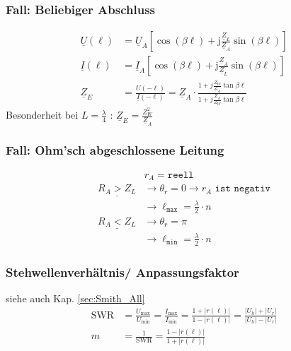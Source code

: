 \subsubsection{Fall: Beliebiger Abschluss}
\begin{align*}
    \underline{U}(\ell) &= \underline{U}_A\left[\cos (\beta \ell)+\mathrm{j} \frac{\underline{Z}_L}{\underline{Z}_A} \sin (\beta \ell)\right] \\
    \underline{I}(\ell) &= \underline{I}_A\left[\cos (\beta \ell)+\mathrm{j} \frac{\underline{Z}_A}{\underline{Z}_L} \sin (\beta \ell)\right] \\
    \underline{Z}_E     &= \frac{U(-\ell)}{\underline{I}(-\ell)}= \underline{Z}_A \cdot \frac{1+j \frac{Z_W}{\underline{Z}_A} \tan \beta \ell}{1+j \frac{\underline{Z}_A}{Z_W} \tan \beta \ell} 
\end{align*}
Besonderheit bei $L=\frac{\lambda}{4}$ :
$ \underline{Z}_E=\frac{Z_{W}^2}{\underline{Z}_A}$

\subsubsection{Fall: Ohm'sch abgeschlossene Leitung}
\begin{align*}
                          & r_A = \texttt{reell} \\
    \underline{R_A > Z_L} & \rightarrow\theta_r = 0 \rightarrow r_A \texttt{ ist negativ} \\
                          & \rightarrow \ell_\texttt{max}=\frac{\lambda}{2}\cdot n \\
    \underline{R_A < Z_L} & \rightarrow\theta_r = \pi                           \\
                          & \rightarrow \ell_\texttt{min}=\frac{\lambda}{2}\cdot n
\end{align*}

\subsubsection{Stehwellenverhältnis/ Anpassungsfaktor}
siehe auch Kap. \ref{sec:Smith_All}
\begin{align*}
    \mathrm{SWR}      & = \frac{U_\text{max}}{U_\text{min}} = \frac{I_\text{max}}{I_\text{min}} = \frac{1+|r(\ell)|}{1-|r(\ell)|} = \frac{|U_h|+|U_r|}{|U_h|-|U_r|} \\
    m                 & = \frac{1}{\mathrm{SWR}} = \frac{1 - |r(\ell)|}{1 + |r(\ell)|}
\end{align*}


